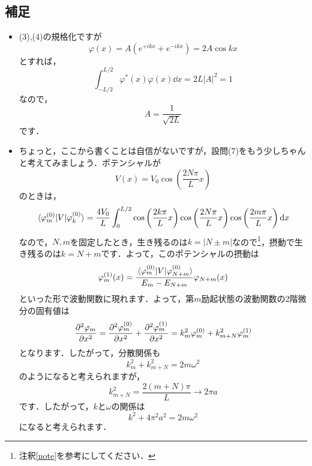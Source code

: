 \documentclass[a4paper,pdflatex,ja=standard]{bxjsarticle}
\begin{document}
\subsection*{補足}

\begin{itemize}
  \item 
  (3),(4)の規格化ですが
  \begin{equation}
    \varphi(x)
    =
    A\left(  
      e^{+ikx}
      +
      e^{-ikx}
    \right)
    =
    2A\cos kx
  \end{equation}
  とすれば，
  \begin{equation}
    \int_{-L/2}^{L/2}
    \varphi^{*}(x)
    \varphi(x)
    \dd x
    =
    2L|A|^2=1
  \end{equation}
  なので，
  \begin{equation}
    A
    =
    \frac{1}{\sqrt{2L}}
  \end{equation}
  です．

  \item 
  ちょっと，ここから書くことは自信がないですが，設問(7)をもう少しちゃんと考えてみましょう．ポテンシャルが
  \begin{equation}
    V(x)
    =
    V_0
    \cos\left( \frac{2N\pi}{L}x \right)
  \end{equation}
  のときは，
  \begin{equation}
    \ev*{\varphi_m^{(0)}|V|\varphi_k^{(0)}}
    =
    \frac{4V_0}{L}
    \int_{0}^{L/2}
    \cos\left( \frac{2k\pi}{L}x \right)
    \cos\left( \frac{2N\pi}{L}x \right)
    \cos\left( \frac{2m\pi}{L}x \right)
    \dd x
  \end{equation}
  なので，$N,m$を固定したとき，生き残るのは$k=|N\pm m|$なので\footnote{
    注釈\ref{note}を参考にしてください．
  }，摂動で生き残るのは$k=N+m$です．よって，このポテンシャルの摂動は
  \begin{equation}
    \varphi_m^{(1)}(x)
    =
    \frac{\ev*{\varphi_m^{(0)}|V|\varphi_{N+m}^{(0)}}}{E_m-E_{N+m}}\varphi_{N+m}(x)
  \end{equation}
  といった形で波動関数に現れます．よって，第$m$励起状態の波動関数の2階微分の固有値は
  \begin{equation}
    \pdv[2]{\varphi_m}{x}
    =
    \pdv[2]{\varphi_m^{(0)}}{x}
    +
    \pdv[2]{\varphi_m^{(1)}}{x}    
    =
    k_m^2\varphi_m^{(0)}
    +
    k_{m+N}^2\varphi_m^{(1)}
  \end{equation}
  となります．したがって，分散関係も
  \begin{equation}
    k_m^2+k_{m+N}^2
    =
    2m\omega^2
  \end{equation}
  のようになると考えられますが，
  \begin{equation}
    k_{m+N}^2
    =
    \frac{2(m+N)\pi}{L}
    \rightarrow
    2\pi a
  \end{equation}
  です．したがって，$k$と$\omega$の関係は
  \begin{equation}
    k^2+4\pi^2 a^2
    =
    2m\omega^2
  \end{equation}
  になると考えられます．

\end{itemize}
\end{document}
